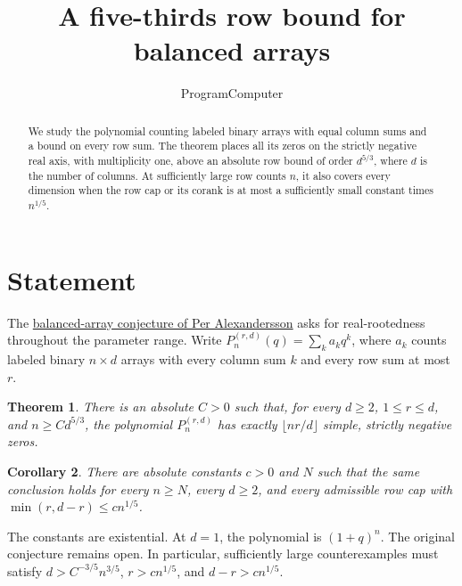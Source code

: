 \documentclass[11pt]{article}
\title{A five-thirds row bound for balanced arrays}
\author{ProgramComputer}
\date{}
\newtheorem{theorem}{Theorem}
\newtheorem{corollary}[theorem]{Corollary}
\begin{document}
\maketitle

\begin{abstract}
We study the polynomial counting labeled binary arrays with equal column sums
and a bound on every row sum. The theorem places all its zeros on
the strictly negative real axis, with multiplicity one, above an absolute row
bound of order $d^{5/3}$, where $d$ is the number of columns. At sufficiently
large row counts $n$, it also covers every dimension when the row cap or
its corank is at most a sufficiently small constant times $n^{1/5}$.
\end{abstract}

\section{Statement}
The \href{https://www.symmetricfunctions.com/realRootedOpenProblems.htm\#conjBalancedArrays}{balanced-array conjecture of Per Alexandersson}
asks for real-rootedness throughout the parameter range. Write
$P_n^{(r,d)}(q)=\sum_k a_kq^k$, where $a_k$ counts labeled binary
$n\times d$ arrays with every column sum $k$ and every row sum at most $r$.

\begin{theorem}
There is an absolute $C>0$ such that, for every $d\ge2$, $1\le r\le d$,
and $n\ge Cd^{5/3}$, the polynomial $P_n^{(r,d)}$ has exactly
$\lfloor nr/d\rfloor$ simple, strictly negative zeros.
\end{theorem}
\begin{corollary}
There are absolute constants $c>0$ and $N$ such that the same conclusion
holds for every $n\ge N$, every $d\ge2$, and every admissible row cap with
$\min(r,d-r)\le c n^{1/5}$.
\end{corollary}
The constants are existential. At $d=1$, the polynomial is $(1+q)^n$.
The original conjecture remains open. In particular, sufficiently large
counterexamples must satisfy $d>C^{-3/5}n^{3/5}$, $r>cn^{1/5}$, and
$d-r>cn^{1/5}$.



\appendix
\clearpage






\end{document}
